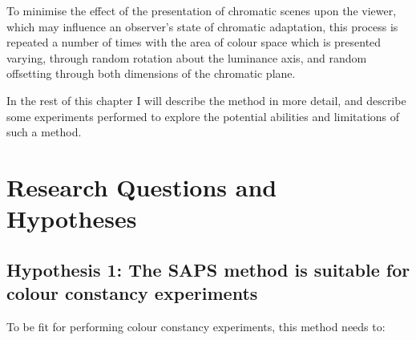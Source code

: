 To minimise the effect of the presentation of chromatic scenes upon the viewer, which may influence an observer's state of chromatic adaptation, this process is repeated a number of times with the area of colour space which is presented varying, through random rotation about the luminance axis, and random offsetting through both dimensions of the chromatic plane.

In the rest of this chapter I will describe the method in more detail, and describe some experiments performed to explore the potential abilities and limitations of such a method.

\section{Research Questions and Hypotheses} \label{sec:qandhyp}

\subsection*{Hypothesis 1: The \gls{SAPS} method is suitable for colour constancy experiments}

To be fit for performing colour constancy experiments, this method needs to:

